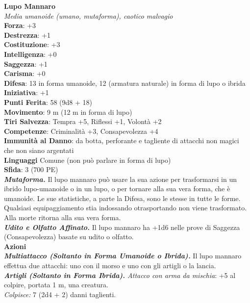 \begin{multicols}{2}
\medskip\textbf{Lupo Mannaro}\\
\emph{Media umanoide (umano, mutaforma), caotico malvagio}\\
\textbf{Forza}: +3\\
\textbf{Destrezza}: +1\\
\textbf{Costituzione}: +3\\
\textbf{Intelligenza}: +0\\
\textbf{Saggezza}: +1\\
\textbf{Carisma}: +0\\
\textbf{Difesa}: 13 in forma umanoide, 12 (armatura naturale) in forma di lupo o ibrida \\ \textbf{Iniziativa}: +1\\
\textbf{Punti Ferita}: 58 (9d8 + 18)\\
\textbf{Movimento}: 9 m (12 m in forma di lupo)\\
\textbf{Tiri Salvezza}: Tempra +5, Riflessi +1, Volontà +2\\
\textbf{Competenze}: Criminalità +3, Consapevolezza +4\\
\textbf{Immunità al Danno}: da botta, perforante e tagliente di attacchi non magici che non siano argentati\\
\textbf{Linguaggi} Comune (non può parlare in forma di lupo)\\
\textbf{Sfida}: 3 (700 PE)\smallskip\\
\emph{\textbf{Mutaforma.}} Il lupo mannaro può usare la sua azione per trasformarsi in un ibrido lupo-umanoide o in un lupo, o per tornare alla sua vera forma, che è umanoide. Le sue statistiche, a parte la Difesa, sono le stesse in tutte le forme. Qualsiasi equipaggiamento stia indossando otrasportando non viene trasformato. Alla morte ritorna alla sua vera  forma.\\

\emph{\textbf{Udito e Olfatto Affinato.}} Il lupo mannaro ha +1d6 nelle prove di Saggezza (Consapevolezza) basate su udito o olfatto.\\
\smallskip\textbf{Azioni}\\

\emph{\textbf{Multiattacco (Soltanto in Forma Umanoide o Ibrida).}} Il lupo mannaro effettua due attacchi: uno con il morso e uno con gli artigli o la lancia.\\
\emph{\textbf{Artigli (Soltanto in Forma Ibrida).} Attacco con arma da mischia}: +5 al colpire, portata 1 m, una creatura.\\
\emph{Colpisce:} 7 (2d4 + 2) danni taglienti.\\


\end{multicols}
